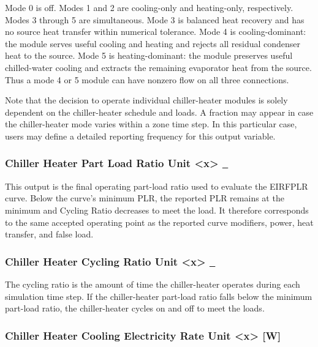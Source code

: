 Mode 0 is off. Modes 1 and 2 are cooling-only and heating-only, respectively. Modes 3 through 5 are simultaneous. Mode 3 is balanced heat recovery and has no source heat transfer within numerical tolerance. Mode 4 is cooling-dominant: the module serves useful cooling and heating and rejects all residual condenser heat to the source. Mode 5 is heating-dominant: the module preserves useful chilled-water cooling and extracts the remaining evaporator heat from the source. Thus a mode 4 or 5 module can have nonzero flow on all three connections.

Note that the decision to operate individual chiller-heater modules is solely dependent on the chiller-heater schedule and loads. A fraction may appear in case the chiller-heater mode varies within a zone time step. In this particular case, users may define a detailed reporting frequency for this output variable.

\subsubsection{Chiller Heater Part Load Ratio Unit \textless{}x\textgreater{} \protect\hyperlink{section-1}{~}}\label{chiller-heater-part-load-ratio-unit-x}

This output is the final operating part-load ratio used to evaluate the EIRFPLR curve. Below the curve's minimum PLR, the reported PLR remains at the minimum and Cycling Ratio decreases to meet the load. It therefore corresponds to the same accepted operating point as the reported curve modifiers, power, heat transfer, and false load.

\subsubsection{Chiller Heater Cycling Ratio Unit \textless{}x\textgreater{} \protect\hyperlink{section-1}{~}}\label{chiller-heater-cycling-ratio-unit-x}

The cycling ratio is the amount of time the chiller-heater operates during each simulation time step. If the chiller-heater part-load ratio falls below the minimum part-load ratio, the chiller-heater cycles on and off to meet the loads.

\subsubsection{Chiller Heater Cooling Electricity Rate Unit \textless{}x\textgreater{} {[}W{]}}\label{chiller-heater-cooling-electric-power-unit-x-w}


